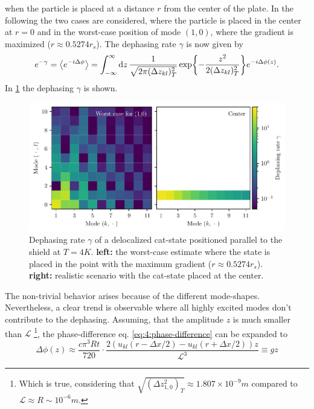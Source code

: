 when the particle is placed at a distance $r$ from the center of the plate. In the following the two cases are considered, where the particle is placed in the center at $r=0$ and in the worst-case position of mode $(1,0)$, where the gradient is maximized ($r \approx 0.5274 r_s$).
The dephasing rate $\gamma$ is now given by
\begin{equation}\label{eq:4:average-dephasing}
  e^{-\gamma} = \left\langle e^{-i\Delta\phi}\right\rangle = \int_{-\infty}^{\infty} \dd z \, \frac{1}{\sqrt{2 \pi (\Delta z_{kl})_T^2}} \exp{-\frac{z^2}{2 (\Delta z_{kl})_T^2}} e^{-i \Delta\phi(z)} .
\end{equation}
In \cref{fig:4:dephasing} the dephasing $\gamma$ is shown.
\begin{figure}[!htbp]
  \centering
  \includegraphics[width=\textwidth]{./../figures/vibrations/vibrational-dephasing-rate.pdf}
  \caption{Dephasing rate $\gamma$ of a delocalized cat-state positioned parallel to the shield at $T=4\si{K}$. \textbf{left:} the worst-case estimate where the state is placed in the point with the maximum gradient ($r\approx 0.5274 r_s$). \textbf{right:} realistic scenario with the cat-state placed at the center.}
  \label{fig:4:dephasing}
\end{figure}
The non-trivial behavior arises because of the different mode-shapes. Nevertheless, a clear trend is observable where all highly excited modes don't contribute to the dephasing.
Assuming, that the amplitude $z$ is much smaller than $\mathscr{L}$ \footnote{Which is true, considering that $\sqrt{(\Delta z_{1,0}^2)_T}\approx 1.807 \times 10^{-9}\si{m}$ compared to $\mathscr{L} \approx R \sim 10^{-6}\si{m}$.}, the phase-difference eq. \eqref{eq:4:phase-difference} can be expanded to
\begin{equation}
  \Delta\phi(z) \approx \frac{c \pi^3 R t}{720} \cdot \frac{2\left(u_{kl}(r - \Delta x/2) -u_{kl}(r + \Delta x/2)\right)z}{\mathscr{L}^3} \equiv g z
\end{equation}
